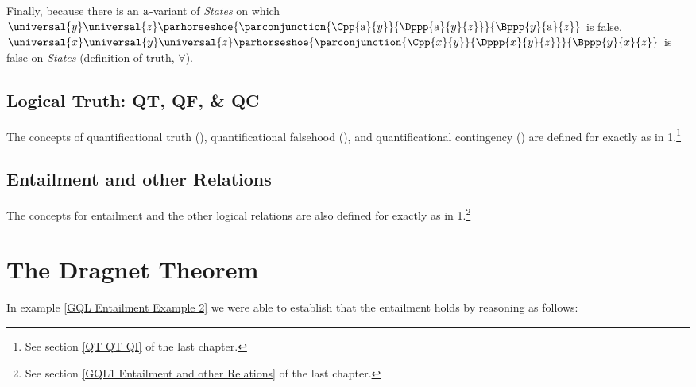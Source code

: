 \begin{PROOF}
Finally, because there is an $\mathrm{a}$-variant of \emph{States} on which $\universal{\variable{y}}\universal{\variable{z}}\parhorseshoe{\parconjunction{\Cpp{\constant{a}}{\variable{y}}}{\Dppp{\constant{a}}{\variable{y}}{\variable{z}}}}{\Bppp{\variable{y}}{\constant{a}}{\variable{z}}}$ is false, $\universal{\variable{x}}\universal{\variable{y}}\universal{\variable{z}}\parhorseshoe{\parconjunction{\Cpp{\variable{x}}{\variable{y}}}{\Dppp{\variable{x}}{\variable{y}}{\variable{z}}}}{\Bppp{\variable{y}}{\variable{x}}{\variable{z}}}$ is false on \emph{States} (definition of truth, $\forall$).
\end{PROOF}

\subsection{Logical Truth: QT, QF, \& QC}\label{QT QF QI GQL}
The concepts of quantificational truth (), quantificational falsehood (), and quantificational contingency () are defined for \GQL{} exactly as in \GQL{}1.\footnote{See section \vref{QT QT QI} of the last chapter.} 

\subsection{Entailment and other Relations}\label{GQL Entailment and other Relations}

The concepts for entailment and the other logical relations are also defined for \GQL{} exactly as in \GQL{}1.\footnote{See section \vref{GQL1 Entailment and other Relations} of the last chapter.} 


\section{The Dragnet Theorem}\label{Dragnet Theorem}

In example \ref{GQL Entailment Example 2} we were able to establish that the entailment   holds by reasoning as follows:

